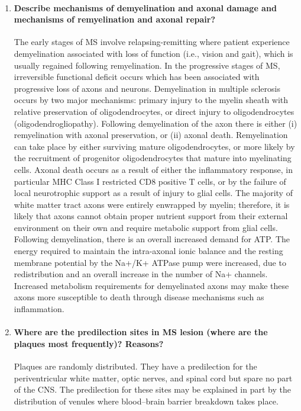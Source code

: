 \documentclass[12pt,article,oneside,a4paper]{memoir}
\begin{document}
\begin{enumerate}
\item \paragraph{Describe mechanisms of demyelination and axonal damage and mechanisms of remyelination and axonal repair?}
The early stages of MS involve relapsing-remitting where patient experience
demyelination associated with loss of function (i.e., vision and gait), which
is usually regained following remyelination. In the progressive stages of MS,
irreversible functional deficit occurs which has been associated with
progressive loss of axons and neurons.
Demyelination in multiple sclerosis occurs by two major mechanisms: primary
injury to the myelin sheath with relative preservation of oligodendrocytes, or
direct injury to oligodendrocytes (oligodendrogliopathy). Following
demyelination of the axon there is either (i) remyelination with axonal
preservation, or (ii) axonal death. Remyelination can take place by either
surviving mature oligodendrocytes, or more likely by the recruitment of
progenitor oligodendrocytes that mature into myelinating cells. Axonal death
occurs as a result of either the inflammatory response, in particular MHC Class
I restricted CD8 positive T cells, or by the failure of local neurotrophic
support as a result of injury to glial cells.
The majority of white matter tract axons were entirely enwrapped by myelin;
therefore, it is likely that axons cannot obtain proper nutrient support from
their external environment on their own and require metabolic support from
glial cells. Following demyelination, there is an overall increased demand for
ATP. The energy required to maintain the intra-axonal ionic balance and the
resting membrane potential by the Na+/K+ ATPase pump were increased, due to
redistribution and an overall increase in the number of Na+ channels.
Increased metabolism requirements for demyelinated axons may make these axons
more susceptible to death through disease mechanisms such as inflammation.

\item \paragraph{Where are the predilection sites in MS lesion (where are the
plaques most frequently)? Reasons?}
Plaques are randomly distributed. They have a predilection for the 
periventricular white matter, optic nerves, and spinal cord but spare no part
of the CNS. The predilection for these sites may be explained in part by the
distribution of venules where blood–brain barrier breakdown takes place.


\end{enumerate}
\end{document}
